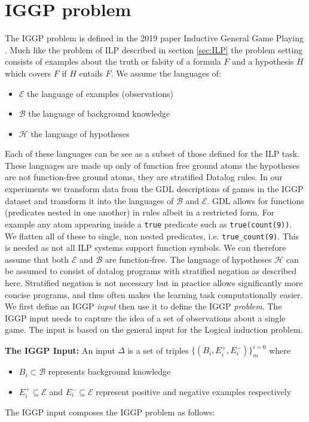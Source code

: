 \chapter{IGGP problem}
\label{ch:IGGP}

The IGGP problem is defined in the 2019 paper Inductive General Game Playing \cite{Cropper/IGGP}. Much like the problem of ILP described in section \ref{sec:ILP} the problem setting consists of examples about the truth or falsity of a formula $F$ and a hypothesis $H$ which covers $F$ if $H$ entails $F$. We assume the languages of:
\begin{itemize}
\item $\mathscr{E}$ the language of examples (observations)
\item $\mathscr{B}$ the language of background knowledge
\item $\mathscr{H}$ the language of hypotheses
\end{itemize}
Each of these languages can be see as a subset of those defined for the ILP task. These languages are made up only of function free ground atoms\cite{Uwe/Logic} \ac{the hypotheses are not function-free ground atoms, they are stratified Datalog rules}. In our experiments we transform data from the GDL descriptions of games in the IGGP dataset and transform it into the languages of $\mathscr{B}$ and $\mathscr{E}$. GDL allows for functions (predicates nested in one another) in rules albeit in a restricted form. For example any atom appearing inside a \texttt{true} predicate such as \texttt{true(count(9))}. We flatten all of these to single, non nested predicates, i.e. \verb|true_count(9)|. This is needed as not all ILP systems support function symbols. We can therefore assume that both $\mathscr{E}$ and $\mathscr{B}$ are function-free. The language of hypotheses $\mathscr{H}$ can be assumed to consist of datalog programs with stratified negation as described here\cite{Kenneth}. Stratified negation is not necessary but in practice allows significantly more concise programs, and thus often makes the learning task computationally easier. We first define an IGGP \textit{input} then use it to define the IGGP \textit{problem}. The IGGP input needs to capture the idea of a set of observations about a single game. The input is based on the general input for the Logical induction problem.

\textbf{The IGGP Input:} An input $\Delta$ is a set of triples $\{(B_i,E_i^+,E_i^-)\}_m^{i=0}$ where
\begin{itemize}
\item $B_i \subset \mathscr{B}$ represents background knowledge
\item $E_i^+ \subseteq \mathscr{E}$ and $E_i^- \subseteq \mathscr{E}$ represent positive and negative examples respectively
\end{itemize}
The IGGP input composes the IGGP problem as follows:

